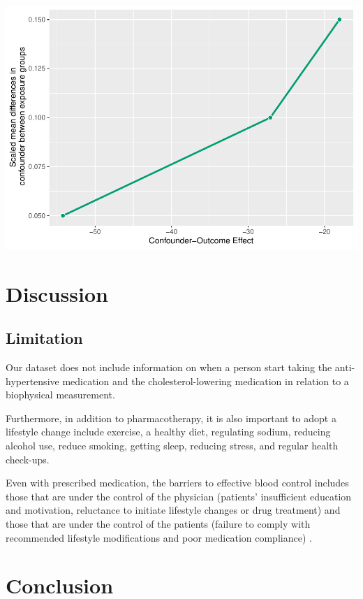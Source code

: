 \documentclass[useAMS,usenatbib,referee]{biom}
\begin{document}
\includegraphics{final-project_files/figure-latex/tab_sensitivity-1.pdf}

\hypertarget{discussion}{%
\section{Discussion}\label{discussion}}

\hypertarget{limitation}{%
\subsection{Limitation}\label{limitation}}

Our dataset does not include information on when a person start taking
the anti-hypertensive medication and the cholesterol-lowering medication
in relation to a biophysical measurement.

Furthermore, in addition to pharmacotherapy, it is also important to
adopt a lifestyle change include exercise, a healthy diet, regulating
sodium, reducing alcohol use, reduce smoking, getting sleep, reducing
stress, and regular health check-ups.

Even with prescribed medication, the barriers to effective blood control
includes those that are under the control of the physician (patients'
insufficient education and motivation, reluctance to initiate lifestyle
changes or drug treatment) and those that are under the control of the
patients (failure to comply with recommended lifestyle modifications and
poor medication compliance) \citep{dusing_overcoming_2006}.

\hypertarget{conclusion}{%
\section{Conclusion}\label{conclusion}}
\end{document}
